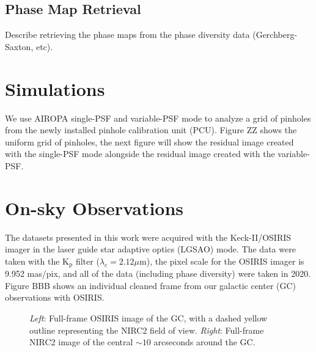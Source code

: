 \documentclass[]{spie}  %
\begin{document}
\subsection{Phase Map Retrieval} \label{subsec:phase-map-retrieval}
Describe retrieving the phase maps from the phase diversity data (Gerchberg-Saxton, etc).

\section{Simulations} \label{sec:simulations}
We use AIROPA single-PSF and variable-PSF mode to analyze a grid of pinholes from the newly installed pinhole calibration unit (PCU). Figure ZZ shows the uniform grid of pinholes, the next figure will show the residual image created with the single-PSF mode alongside the residual image created with the variable-PSF.

\section{On-sky Observations}\label{sec:on-sky-obs}
The datasets presented in this work were acquired with the Keck-II/OSIRIS imager in the laser guide star adaptive optics (LGSAO) mode. The data were taken with the K$_{\textrm{p}}$ filter ($\lambda_{c} = 2.12\mu$m), the pixel scale for the OSIRIS imager is 9.952 mas/pix, and all of the data (including phase diversity) were taken in 2020. Figure BBB shows an individual cleaned frame from our galactic center (GC) observations with OSIRIS.

\begin{figure}[!h]
  \hspace{-20mm}
  \caption{\footnotesize \textit{Left}: Full-frame OSIRIS image of the GC, with a dashed yellow outline representing the NIRC2 field of view. \textit{Right}: Full-frame NIRC2 image of the central ${\sim}10$ arcseconds around the GC.} \label{fig:gc_osiris_nirc2}
\end{figure}


\listoffigures
\end{document}
